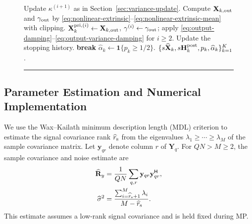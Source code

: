 \begin{figure}[!t]
\begin{minipage}{\linewidth}
\begin{algorithmic}[1]
  \State Update $\kappa^{(i+1)}$ as in Section~\ref{sec:variance-update}.
  \State Compute $\mathbf X_{k,\rm out}$ and $\gamma_{\rm out}$ by
  \eqref{eq:nonlinear-extrinsic}--\eqref{eq:nonlinear-extrinsic-mean} with clipping.
  \State $\mathbf X_k^{{\rm pri},(i)}\gets\mathbf X_{k,\rm out}$,
  $\gamma^{(i)}\gets\gamma_{\rm out}$; apply
  \eqref{eq:output-damping}--\eqref{eq:output-variance-damping} for $i\geq2$.
  \State Update the stopping history.
   \State \textbf{break}
  \EndIf
 \EndFor
 \State $\widehat\alpha_k\gets\mathbf1\{p_k\geq1/2\}$.
 \State \Return $\{s\widehat{\mathbf X}_k,s\mathbf H_k^{\rm post},p_k,\widehat\alpha_k\}_{k=1}^K$.
\end{algorithmic}
\vspace{3pt}\hrule
\end{minipage}
\end{figure}

\subsection{Parameter Estimation and Numerical Implementation}
\label{sec:frontend}
\label{sec:phase-estimation}
\label{sec:variance-update}
\label{sec:damping}

We use the Wax--Kailath minimum description length (MDL) criterion
\cite{wax1985} to estimate the signal covariance rank
$\widehat r_{\rm s}$ from the eigenvalues
$\lambda_1\geq\cdots\geq\lambda_M$ of the sample covariance matrix.
Let $\mathbf y_{qr}$ denote column $r$ of $\mathbf Y_q$. For
$QN>M\geq2$, the sample covariance and noise estimate are
\begin{align}
 \widehat{\mathbf R}_y&=\frac1{QN}\sum_{q,r}
 \mathbf y_{qr}\mathbf y_{qr}^{\mathsf H},
 \label{eq:sample-spatial-covariance}\\
 \widehat\sigma^2&=\frac{\sum_{i=\widehat r_{\rm s}+1}^{M}\lambda_i}
 {M-\widehat r_{\rm s}}.
 \label{eq:noise-estimation}
\end{align}
This estimate assumes a low-rank signal covariance and is held fixed
during MP.


